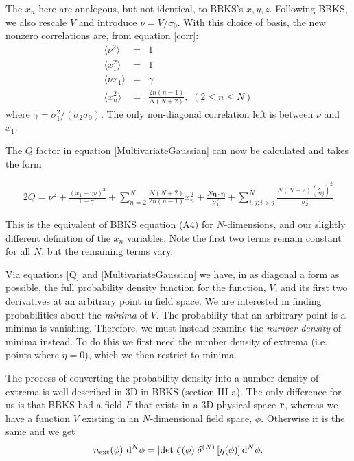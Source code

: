 \documentclass[12pt]{article}
\begin{document}

The $x_n$ here are analogous, but not identical, to BBKS's $x, y, z$. Following BBKS, we also rescale $V$ and introduce $\nu = V/\sigma_0$. With this choice of basis, the new nonzero correlations are, from equation \eqref{corr}:
%
\begin{eqnarray}
  \langle\nu^2\rangle &=& 1 \nonumber\\
  \langle x_1^2\rangle&=&1 \\
  \langle\nu x_1\rangle &=& \gamma \nonumber\\
  \langle x_n^2 \rangle &=& \frac{2n(n-1)}{N(N+2)},\,\, (2\leq n \leq N) \nonumber
\end{eqnarray}
%
\noindent where $\gamma = \sigma_1^2/(\sigma_2 \sigma_0)$. The only non-diagonal correlation left is between $\nu$ and $x_1$.

The $Q$ factor in equation \eqref{MultivariateGaussian} can now be calculated and takes the form

\begin{equation} \label{Q}
\begin{split}
2Q = \nu^2 + \frac{(x_1-\gamma \nu)^2}{1-\gamma^2}+\sum_{n=2}^N\frac{N(N+2)}{2n(n-1)}x_n^2 + \frac{N \pmb{\eta}\cdot \pmb{\eta}}{\sigma_1^2} + \sum_{i,j;i > j}^N\frac{N(N+2)(\zeta_{ij})^2}{\sigma_2^2}
\end{split}
\end{equation}
%

This is the equivalent of BBKS equation (A4) for $N$-dimensions, and our slightly different definition of the $x_n$ variables. Note the first two terms remain constant for all $N$, but the remaining terms vary.

Via equations \eqref{Q} and \eqref{MultivariateGaussian} we have, in as diagonal a form as possible, the full probability density function for the function, $V$, and its first two derivatives at an arbitrary point in field space. We are interested in finding probabilities about the \emph{minima} of $V$. The probability that an arbitrary point is a minima is vanishing. Therefore, we must instead examine the \emph{number density} of minima instead. To do this we first need the number density of extrema (i.e. points where $\eta=0$), which we then restrict to minima.

The process of converting the probability density into a number density of extrema is well described in 3D in BBKS \cite{BBKS} (section III a). The only difference for us is that BBKS had a field $F$ that exists in a 3D physical space ${\bf r}$, whereas we have a function $V$ existing in an $N$-dimensional field space, $\phi$. Otherwise it is the same and we get
\begin{equation}
n_{\rm ext}(\phi) \,\,{\rm d}^N \phi= |{\rm det}\,\, \zeta(\phi)| \delta^{(N)}\left[ \eta(\phi)\right] {\rm d}^N \phi.
\end{equation}
\end{document}
